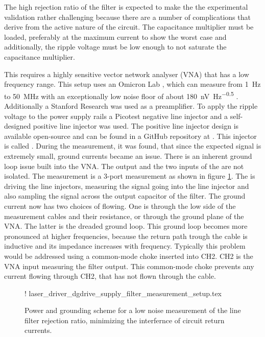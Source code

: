 The high rejection ratio of the filter is expected to make the the experimental validation rather challenging because there are a number of complications that derive from the active nature of the circuit. The capacitance multiplier must be loaded, preferably at the maximum current to show the worst case and additionally, the ripple voltage must be low enough to not saturate the capacitance multiplier.

This requires a highly sensitive vector network analyser (VNA) that has a low frequency range. This setup uses an Omicron Lab , which can measure from \qty{1}{\Hz} to \qty{50}{\MHz} with an exceptionally low noise floor of about \qty[power-half-as-sqrt, per-mode=symbol]{180}{\nV \Hz\tothe{-0.5}} \cite{datasheet_bode100}. Additionally a Stanford Research  was used as a preamplifier. To apply the ripple voltage to the power supply rails a Picotest  negative line injector and a self-designed positive line injector was used. The positive line injector design is available open-source and can be found in a GitHub repository at \cite{line_injector_github}. This injector is called . During the measurement, it was found, that since the expected signal is extremely small, ground currents became an issue. There is an inherent ground loop issue built into the VNA. The output and the two inputs of the  are not isolated. The measurement is a 3-port measurement as shown in figure \ref{fig:laser_driver_supply_filter_measurement}. The  is driving the line injectors, measuring the signal going into the line injector and also sampling the signal across the output capacitor of the filter. The ground current now has two choices of flowing. One is through the low side of the measurement cables and their resistance, or through the ground plane of the VNA. The latter is the dreaded ground loop. This ground loop becomes more pronounced at higher frequencies, because the return path trough the cable is inductive and its impedance increases with frequency. Typically this problem would be addressed using a common-mode choke inserted into CH2. CH2 is the VNA input measuring the filter output. This common-mode choke prevents any current flowing through CH2, that has not flown through the cable.
\begin{figure}[ht]
    \centering
     {!} {
        {laser_driver_dgdrive_supply_filter_measurement_setup.tex}
    } %
    \caption{Power and grounding scheme for a low noise measurement of the line filter rejection ratio, minimizing the interfernce of circuit return currents.}
    \label{fig:laser_driver_supply_filter_measurement}
\end{figure}


